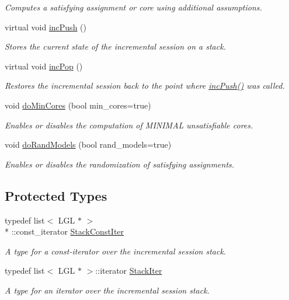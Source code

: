 \begin{DoxyCompactItemize}
\begin{DoxyCompactList}\small\item\em Computes a satisfying assignment or core using additional assumptions. \end{DoxyCompactList}\item 
virtual void \hyperlink{classLingelingApi_a91c858d2a36a4fbe580909a793802a76}{inc\-Push} ()
\begin{DoxyCompactList}\small\item\em Stores the current state of the incremental session on a stack. \end{DoxyCompactList}\item 
virtual void \hyperlink{classLingelingApi_afe43e1243338a332803fff470eedbf7a}{inc\-Pop} ()
\begin{DoxyCompactList}\small\item\em Restores the incremental session back to the point where \hyperlink{classLingelingApi_a91c858d2a36a4fbe580909a793802a76}{inc\-Push()} was called. \end{DoxyCompactList}\item 
void \hyperlink{classSatSolver_a159fc9658709e5aeba2844a09454b2cb}{do\-Min\-Cores} (bool min\-\_\-cores=true)
\begin{DoxyCompactList}\small\item\em Enables or disables the computation of M\-I\-N\-I\-M\-A\-L unsatisfiable cores. \end{DoxyCompactList}\item 
void \hyperlink{classSatSolver_ae229c5e277350710412fce0e867dc566}{do\-Rand\-Models} (bool rand\-\_\-models=true)
\begin{DoxyCompactList}\small\item\em Enables or disables the randomization of satisfying assignments. \end{DoxyCompactList}\end{DoxyCompactItemize}
\subsection*{Protected Types}
\begin{DoxyCompactItemize}
\item 
typedef list$<$ L\-G\-L $\ast$ $>$\\*
\-::const\-\_\-iterator \hyperlink{classLingelingApi_a5c16b047da9b5bd344f30a855dac52e7}{Stack\-Const\-Iter}
\begin{DoxyCompactList}\small\item\em A type for a const-\/iterator over the incremental session stack. \end{DoxyCompactList}\item 
typedef list$<$ L\-G\-L $\ast$ $>$\-::iterator \hyperlink{classLingelingApi_aa4ab290e2a0f65677b6e58b675741535}{Stack\-Iter}
\begin{DoxyCompactList}\small\item\em A type for an iterator over the incremental session stack. \end{DoxyCompactList}\end{DoxyCompactItemize}

